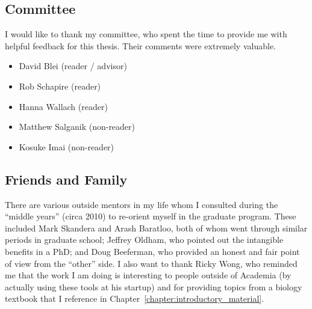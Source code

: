 

\subsection*{Committee}
I would like to thank my committee, who spent the time to provide me
with helpful feedback for this thesis.  Their comments were extremely valuable.
\begin{itemize}
  \item David Blei (reader / advisor)
  \item Rob Schapire (reader)
  \item Hanna Wallach (reader)
  \item Matthew Salganik (non-reader)
  \item Kosuke Imai (non-reader)
\end{itemize}

\subsection*{Friends and Family}

There are various outside mentors in my life whom I consulted during
the ``middle years'' (circa 2010) to re-orient myself in the graduate
program. These included Mark Skandera and Arash Baratloo, both of whom
went through similar periods in graduate school; Jeffrey Oldham, who
pointed out the intangible benefits in a PhD; and Doug Beeferman, who
provided an honest and fair point of view from the ``other'' side.  I
also want to thank Ricky Wong, who reminded me that the work I am
doing is interesting to people outside of Academia (by actually using
these tools at his startup) and for providing topics from a biology
textbook that I reference in
Chapter~\ref{chapter:introductory_material}.

